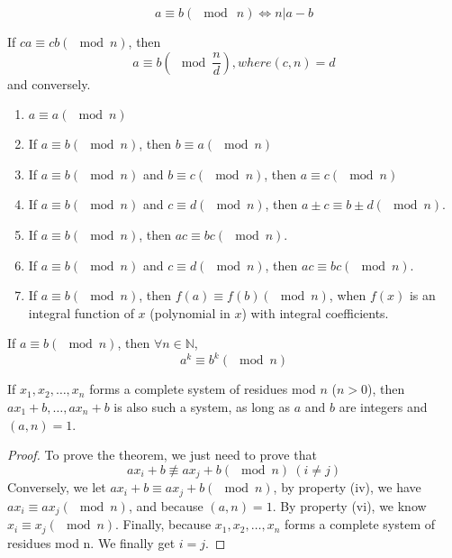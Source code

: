 \documentclass[11pt]{Numbertheory}
\begin{document}
\begin{theorem}
    \[ a \equiv b (\mod \ n) \Longleftrightarrow n | a-b\]
\end{theorem}

\begin{theorem}
    If $ca \equiv cb (\mod n)$, then 
    \[ a\equiv b \left (\mod \frac{n}{d} \right ), where  (c,n) = d \]
    and conversely.
\end{theorem}\label{Theorem.6}

\begin{proposition}
    \begin{enumerate}
        \item $a\equiv a (\mod n)$
        \item If $a\equiv b(\mod n)$, then $b\equiv a(\mod n)$
        \item If $a\equiv b(\mod n)$ and $b\equiv c(\mod n)$, then $a\equiv c(\mod n)$
        \item If $a\equiv b(\mod n)$ and $c\equiv d(\mod n)$, then $a\pm c \equiv b \pm d(\mod n)$.
        \item If $a\equiv b(\mod n)$, then $ac \equiv bc(\mod n)$.
        \item If $a\equiv b(\mod n)$ and $c\equiv d(\mod n)$, then $ac \equiv bc (\mod n)$.
        \item If $a\equiv b(\mod n)$, then $f(a) \equiv f(b) (\mod n)$, when $f(x)$ is an integral function of $x$ (polynomial in $x$)
        with integral coefficients.
    \end{enumerate}
\end{proposition}

\begin{corollary}
    If $a\equiv b(\mod n)$, then $\forall n\in \mathbb{N}$, 
    \[a^k \equiv b^k (\mod n) \]    
\end{corollary}


\begin{theorem}
    If $x_1, x_2,\ldots, x_n$ forms a complete system of residues mod $n$ ($n > 0$), then $ax_1 + b, \ldots, ax_n+b$ is also 
    such a system, as long as $a$ and $b$ are integers and $(a, n) = 1$.
\end{theorem}

\begin{proof}
    To prove the theorem, we just need to prove that 
    \[ ax_i + b \not \equiv ax_j + b (\mod n)\ (i \ne j)     \]
    Conversely, we let $ax_i + b\equiv ax_j + b (\mod n)$, by property (iv), we have $ax_i\equiv ax_j (\mod n)$, and because 
    $(a, n) = 1$. By property (vi), we know $x_i \equiv x_j (\mod n)$. Finally, because ${x_1, x_2, \ldots, x_n }$ forms a complete 
    system of residues mod n. We finally get $i = j$. 
\end{proof}
\end{document}

